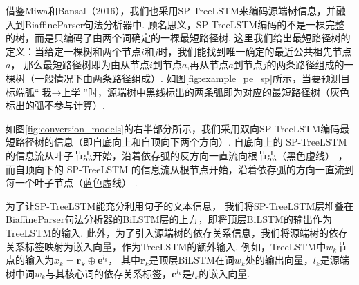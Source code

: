 借鉴Miwa和Bansal（2016），我们也采用SP-TreeLSTM来编码源端树信息，并融入到BiaffineParser句法分析器中.
顾名思义，SP-TreeLSTM编码的不是一棵完整的树，而是只编码了由两个词确定的一棵最短路径树.
这里我们给出最短路径树的定义：当给定一棵树和两个节点$i$和$j$时，我们能找到唯一确定的最近公共祖先节点$a$，
那么最短路径树即为由从节点$i$到节点$a$,再从节点$a$到节点$j$的两条路径组成的一棵树（一般情况下由两条路径组成）.
如图\ref{fig:example_pe_sp}所示，当要预测目标端弧“$\mbox{我}\rightarrow \mbox{上学}$”时，源端树中黑线标出的两条弧即为对应的最短路径树（灰色标出的弧不参与计算）.

如图\ref{fig:conversion_models}的右半部分所示，我们采用双向SP-TreeLSTM编码最短路径树的信息（即自底向上和自顶向下两个方向）.
自底向上的 SP-TreeLSTM 的信息流从叶子节点开始，沿着依存弧的反方向一直流向根节点（黑色虚线） ，
而自顶向下的 SP-TreeLSTM 的信息流从根节点开始，沿着依存弧的方向一直流到每一个叶子节点（蓝色虚线） .

为了让SP-TreeLSTM能充分利用句子的文本信息，
我们将SP-TreeLSTM层堆叠在BiaffineParser句法分析器的BiLSTM层的上方，即将顶层BiLSTM的输出作为TreeLSTM的输入.
此外，为了引入源端树的依存关系信息，我们将源端树的依存关系标签映射为嵌入向量，作为TreeLSTM的额外输入.
例如，TreeLSTM中$w_k$节点的输入为$x_k=
    \mathbf{r_k} \oplus \mathbf{e}^{l_k}$，
其中$\mathbf{r}_k$是顶层BiLSTM在词$w_k$处的输出向量，$l_k$是源端树中词$w_k$与其核心词的依存关系标签，$\mathbf{e}^{l_k}$是$l_k$的嵌入向量.

